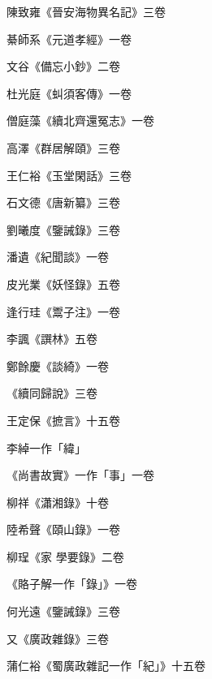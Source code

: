 \begin{pinyinscope}
 陳致雍《晉安海物異名記》三卷



 綦師系《元道孝經》一卷



 文谷《備忘小鈔》二卷



 杜光庭《虯須客傳》一卷



 僧庭藻《續北齊還冤志》一卷



 高澤《群居解頤》三卷



 王仁裕《玉堂閑話》三卷



 石文德《唐新纂》三卷



 劉曦度《鑒誡錄》三卷



 潘遺《紀聞談》一卷



 皮光業《妖怪錄》五卷



 逢行珪《鬻子注》一卷



 李諷《譔林》五卷



 鄭餘慶《談綺》一卷



 《續同歸說》三卷



 王定保《摭言》十五卷



 李綽一作「緯」



 《尚書故實》一作「事」一卷



 柳祥《瀟湘錄》十卷



 陸希聲《頤山錄》一卷



 柳珵《家
 學要錄》二卷



 《賂子解一作「錄」》一卷



 何光遠《鑒誡錄》三卷



 又《廣政雜錄》三卷



 蒲仁裕《蜀廣政雜記一作「紀」》十五卷




\end{pinyinscope}
